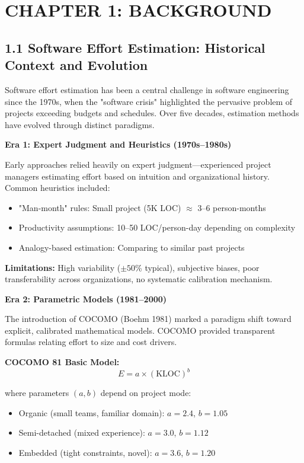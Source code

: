 \documentclass[11pt,a4paper]{article}
\begin{document}
\section{CHAPTER 1: BACKGROUND}
\label{sec:background}

\subsection{1.1 Software Effort Estimation: Historical Context and Evolution}

Software effort estimation has been a central challenge in software engineering since the 1970s, when the "software crisis" highlighted the pervasive problem of projects exceeding budgets and schedules. Over five decades, estimation methods have evolved through distinct paradigms.

\textbf{Era 1: Expert Judgment and Heuristics (1970s--1980s)}

Early approaches relied heavily on expert judgment---experienced project managers estimating effort based on intuition and organizational history. Common heuristics included:
\begin{itemize}
    \item "Man-month" rules: Small project (5K LOC) $\approx$ 3--6 person-months
    \item Productivity assumptions: 10--50 LOC/person-day depending on complexity
    \item Analogy-based estimation: Comparing to similar past projects
\end{itemize}

\textbf{Limitations:} High variability ($\pm 50$\% typical), subjective biases, poor transferability across organizations, no systematic calibration mechanism.

\textbf{Era 2: Parametric Models (1981--2000)}

The introduction of COCOMO (Boehm 1981) marked a paradigm shift toward explicit, calibrated mathematical models. COCOMO provided transparent formulas relating effort to size and cost drivers.

\textbf{COCOMO 81 Basic Model:}
\begin{equation}
E = a \times (\text{KLOC})^b
\label{eq:cocomo81}
\end{equation}

where parameters $(a, b)$ depend on project mode:
\begin{itemize}
    \item Organic (small teams, familiar domain): $a = 2.4$, $b = 1.05$
    \item Semi-detached (mixed experience): $a = 3.0$, $b = 1.12$
    \item Embedded (tight constraints, novel): $a = 3.6$, $b = 1.20$
\end{itemize}
\end{document}
